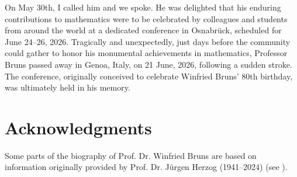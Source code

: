 \documentclass[10pt]{amsart}
\begin{document}
	On May 30th, I called him and we spoke. He was delighted that his enduring contributions to mathematics were to be celebrated by colleagues and students from around the world at a dedicated conference in Osnabr\"{u}ck, scheduled for June 24--26, 2026. Tragically and unexpectedly, just days before the community could gather to honor his monumental achievements in mathematics, Professor Bruns passed away in Genoa, Italy, on 21 June, 2026, following a sudden stroke. The conference, originally conceived to celebrate Winfried Bruns' 80th birthday, was ultimately held in his memory.
	
	\section*{Acknowledgments}
	
	Some parts of the biography of Prof. Dr. Winfried Bruns are based on information originally provided by Prof. Dr. J\"{u}rgen Herzog (1941--2024) (see \cite{CGR2017}).
	
\end{document}
